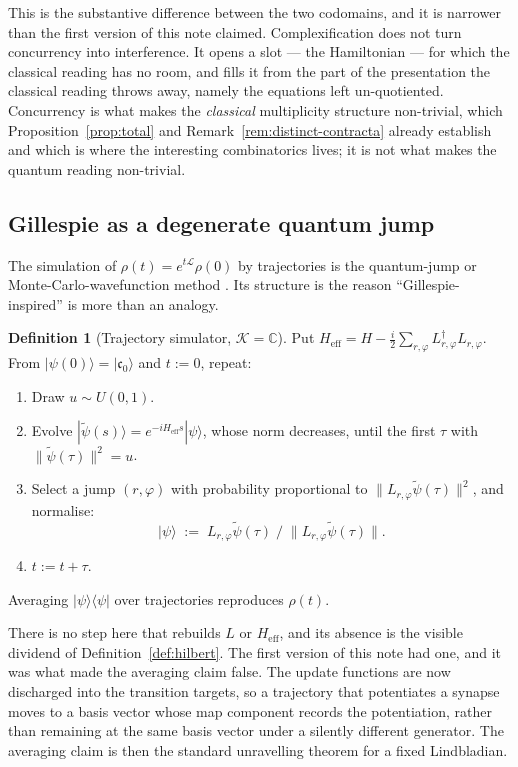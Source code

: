 \documentclass[11pt,a4paper]{article}
\theoremstyle{plain}
\theoremstyle{definition}
\newtheorem{definition}[theorem]{Definition}
\theoremstyle{remark}
\newcommand{\Cx}{\mathbb{C}}
\newcommand{\Lop}{L}
\newcommand{\Heff}{H_{\mathrm{eff}}}
\begin{document}
This is the substantive difference between the two codomains, and it is narrower than the first
version of this note claimed. Complexification does not turn concurrency into interference. It opens
a slot --- the Hamiltonian --- for which the classical reading has no room, and fills it from the part
of the presentation the classical reading throws away, namely the equations left un-quotiented.
Concurrency is what makes the \emph{classical} multiplicity structure non-trivial, which
Proposition~\ref{prop:total} and Remark~\ref{rem:distinct-contracta} already establish and which is
where the interesting combinatorics lives; it is not what makes the quantum reading non-trivial.

\subsection{Gillespie as a degenerate quantum jump}
\label{sec:degeneration}

The simulation of $\rho(t) = e^{t\mathcal{L}}\rho(0)$ by trajectories is the quantum-jump or
Monte-Carlo-wavefunction method \cite{dalibard,mcwf}. Its structure is the reason
``Gillespie-inspired'' is more than an analogy.

\begin{definition}[Trajectory simulator, $\mathcal{K} = \Cx$]
\label{def:qjump}
Put $\Heff = H - \tfrac{i}{2}\sum_{r,\varphi}\Lop^\dagger_{r,\varphi}\Lop_{r,\varphi}$. From
$|\psi(0)\rangle = |\mathfrak{c}_0\rangle$ and $t := 0$, repeat:
\begin{enumerate}[leftmargin=2.2em]
\item Draw $u \sim U(0,1)$.
\item Evolve $|\tilde\psi(s)\rangle = e^{-i \Heff s}|\psi\rangle$, whose norm decreases, until the
first $\tau$ with $\|\tilde\psi(\tau)\|^2 = u$.
\item Select a jump $(r,\varphi)$ with probability proportional to
$\|\Lop_{r,\varphi}\tilde\psi(\tau)\|^2$, and normalise:
\[
|\psi\rangle \;:=\; \Lop_{r,\varphi}\tilde\psi(\tau) \;\big/\; \big\|\Lop_{r,\varphi}\tilde\psi(\tau)\big\| .
\]
\item $t := t + \tau$.
\end{enumerate}
Averaging $|\psi\rangle\langle\psi|$ over trajectories reproduces $\rho(t)$.
\end{definition}

There is no step here that rebuilds $\Lop$ or $\Heff$, and its absence is the visible dividend of
Definition~\ref{def:hilbert}. The first version of this note had one, and it was what made the
averaging claim false. The update functions are now discharged into the transition targets, so a
trajectory that potentiates a synapse moves to a basis vector whose map component records the
potentiation, rather than remaining at the same basis vector under a silently different generator.
The averaging claim is then the standard unravelling theorem for a fixed Lindbladian.
\end{document}
